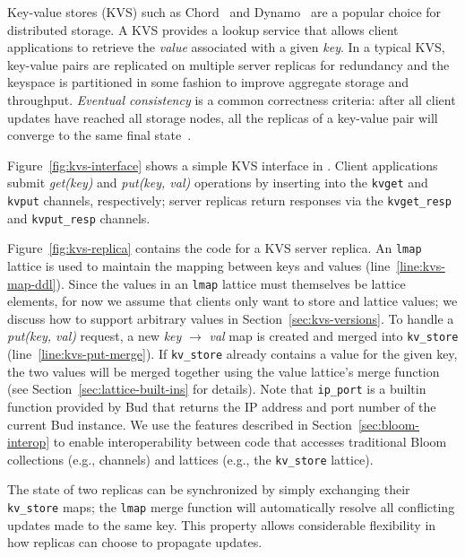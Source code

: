 Key-value stores (KVS) such as Chord~\cite{Stoica2001} and
Dynamo~\cite{DeCandia2007} are a popular choice for distributed storage. A KVS
provides a lookup service that allows client applications to retrieve the
\emph{value} associated with a given \emph{key}. In a typical KVS, key-value
pairs are replicated on multiple server replicas for redundancy and the keyspace
is partitioned in some fashion to improve aggregate storage and
throughput. \emph{Eventual consistency} is a common correctness criteria: after
all client updates have reached all storage nodes, all the replicas of a
key-value pair will converge to the same final state~\cite{Terry1995,vogels}.

Figure~\ref{fig:kvs-interface} shows a simple KVS interface in \lang. Client
applications submit \emph{get(key)} and \emph{put(key, val)} operations by
inserting into the \texttt{kvget} and \texttt{kvput} channels, respectively;
server replicas return responses via the \texttt{kvget\_resp} and
\texttt{kvput\_resp} channels.

Figure~\ref{fig:kvs-replica} contains the \lang code for a KVS server
replica. An \texttt{lmap} lattice is used to maintain the mapping between keys
and values (line~\ref{line:kvs-map-ddl}). Since the values in an \texttt{lmap}
lattice must themselves be lattice elements, for now we assume that clients only
want to store and lattice values; we discuss how to support arbitrary values in
Section~\ref{sec:kvs-versions}. To handle a \emph{put(key, val)} request, a new
\emph{key} $\to$ \emph{val} map is created and merged into \texttt{kv\_store}
(line~\ref{line:kvs-put-merge}). If \texttt{kv\_store} already contains a value
for the given key, the two values will be merged together using the value
lattice's merge function (see Section~\ref{sec:lattice-built-ins} for
details). Note that \texttt{ip\_port} is a builtin function provided by Bud that
returns the IP address and port number of the current Bud instance. We use the
\lang features described in Section~\ref{sec:bloom-interop} to enable
interoperability between code that accesses traditional Bloom collections (e.g.,
channels) and lattices (e.g., the \texttt{kv\_store} lattice).

The state of two replicas can be synchronized by simply exchanging their
\texttt{kv\_store} maps; the \texttt{lmap} merge function will automatically
resolve all conflicting updates made to the same key. This property allows
considerable flexibility in how replicas can choose to propagate updates.


